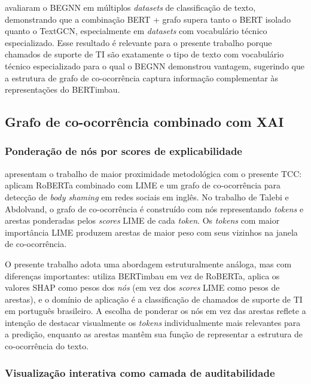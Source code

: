 \documentclass[
    12pt,                %
    openright,           %
    oneside,             %
    a4paper,             %
    english,             %
    brazil               %
]{abntex2}
\begin{document}
 avaliaram o BEGNN em múltiplos \textit{datasets} de classificação de texto, demonstrando que a combinação BERT + grafo supera tanto o BERT isolado quanto o TextGCN, especialmente em \textit{datasets} com vocabulário técnico especializado. Esse resultado é relevante para o presente trabalho porque chamados de suporte de TI são exatamente o tipo de texto com vocabulário técnico especializado para o qual o BEGNN demonstrou vantagem, sugerindo que a estrutura de grafo de co-ocorrência captura informação complementar às representações do BERTimbau.

\subsection{Grafo de co-ocorrência combinado com XAI}
\label{subsec:grafo_xai}

\subsubsection{Ponderação de nós por scores de explicabilidade}
\label{subsubsec:grafo_xai_ponderacao}

 apresentam o trabalho de maior proximidade metodológica com o presente TCC: aplicam RoBERTa combinado com LIME e um grafo de co-ocorrência para detecção de \textit{body shaming} em redes sociais em inglês. No trabalho de Talebi e Abdolvand, o grafo de co-ocorrência é construído com nós representando \textit{tokens} e arestas ponderadas pelos \textit{scores} LIME de cada \textit{token}. Os \textit{tokens} com maior importância LIME produzem arestas de maior peso com seus vizinhos na janela de co-ocorrência.

O presente trabalho adota uma abordagem estruturalmente análoga, mas com diferenças importantes: utiliza BERTimbau em vez de RoBERTa, aplica os valores SHAP como pesos dos \textit{nós} (em vez dos \textit{scores} LIME como pesos de arestas), e o domínio de aplicação é a classificação de chamados de suporte de TI em português brasileiro. A escolha de ponderar os nós em vez das arestas reflete a intenção de destacar visualmente os \textit{tokens} individualmente mais relevantes para a predição, enquanto as arestas mantêm sua função de representar a estrutura de co-ocorrência do texto.

\subsubsection{Visualização interativa como camada de auditabilidade}
\label{subsubsec:grafo_xai_visualizacao}
\end{document}
